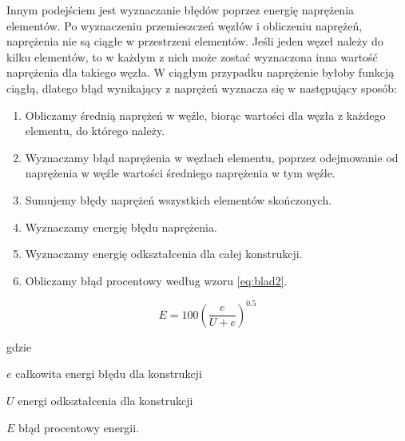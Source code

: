 \vspace{5mm}

Innym podejściem jest wyznaczanie błędów poprzez energię naprężenia elementów. Po wyznaczeniu przemieszczeń węzłów i obliczeniu naprężeń, naprężenia nie są ciągłe w przestrzeni elementów. Jeśli jeden węzeł należy do kilku elementów, to w każdym z nich może zostać wyznaczona inna wartość naprężenia dla takiego węzła. W ciągłym przypadku naprężenie byłoby funkcją ciągłą, dlatego błąd wynikający z naprężeń wyznacza się w następujący sposób:

\vspace{3mm}

\begin{enumerate}
	\item Obliczamy średnią naprężeń w węźle, biorąc wartości dla węzła z każdego elementu, do którego należy.
	\item Wyznaczamy błąd naprężenia w węzłach elementu, poprzez odejmowanie od naprężenia w węźle wartości średniego naprężenia w tym węźle.
	\item Sumujemy błędy naprężeń wszystkich elementów skończonych.
	\item Wyznaczamy energię błędu naprężenia.
	\item Wyznaczamy energię odkształcenia dla całej konstrukcji.
	\item Obliczamy błąd procentowy według wzoru \ref{eq:blad2}.
\end{enumerate}

\vspace{3mm}

\begin{equation} \label{eq:blad2}
	E = 100(\frac{e}{U + e})^{0.5}
\end{equation}

gdzie
\begin{eqwhere}[2cm]
	\item[$ e $] całkowita energi błędu dla konstrukcji
	\item[$ U $] energi odkształcenia dla konstrukcji
	\item[$ E $] błąd procentowy energii.
\end{eqwhere}




















